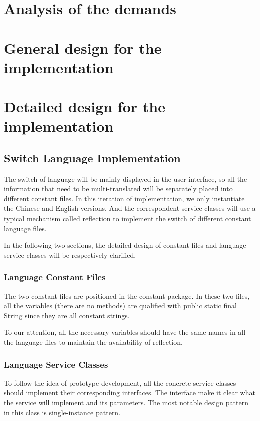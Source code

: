 \documentclass[a4paper]{report}
\begin{document}
\chapter{Analysis of the demands}



\chapter{General design for the implementation}



\chapter{Detailed design for the implementation}

\section{Switch Language Implementation}
\par The switch of language will be mainly displayed in the user interface, so all the information that need to be multi-translated will be separately placed into  different constant files. In this iteration of implementation, we only instantiate the Chinese and English versions. And the correspondent service classes will use a typical mechanism called reflection to implement the switch of different constant language files.
\par In the following two sections, the detailed design of constant files and language service classes will be respectively clarified.
\subsection{Language Constant Files}
\par The two constant files are positioned in the constant package. In these two files, all the variables (there are no methods) are qualified with public static final String since they are all constant strings.
\par To our attention, all the necessary variables should have the same names in all the language files to maintain the availability of reflection.
\subsection{Language Service Classes }
\par To follow the idea of prototype development, all the concrete service classes should implement their corresponding interfaces. The interface make it clear what the service will implement and its parameters. The most notable design pattern in this class is single-instance pattern.
\end{document}
